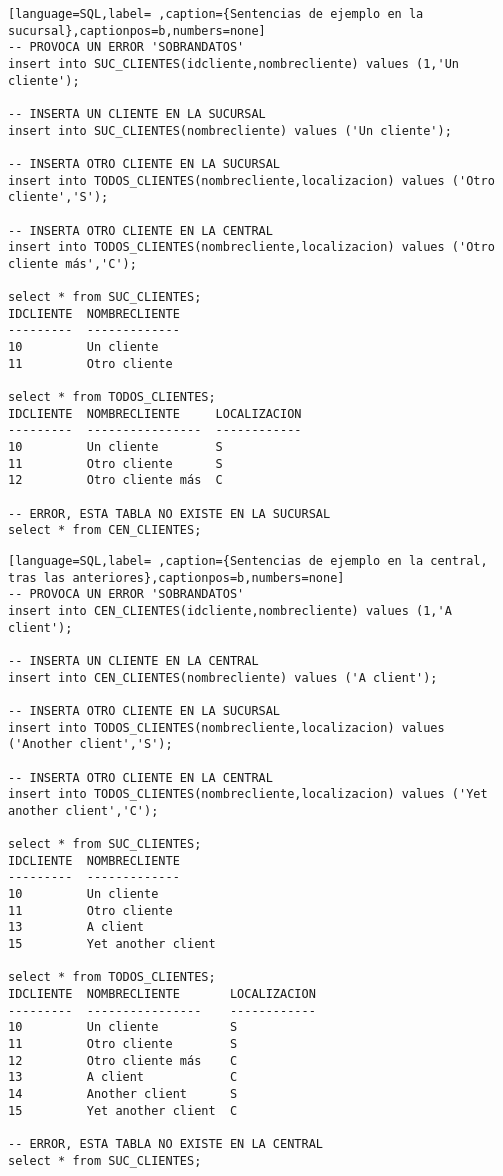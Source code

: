 \documentclass[a4paper]{article}
\begin{document}
\begin{lstlisting}[language=SQL,label= ,caption={Sentencias de ejemplo en la sucursal},captionpos=b,numbers=none]
-- PROVOCA UN ERROR 'SOBRANDATOS'
insert into SUC_CLIENTES(idcliente,nombrecliente) values (1,'Un cliente');

-- INSERTA UN CLIENTE EN LA SUCURSAL
insert into SUC_CLIENTES(nombrecliente) values ('Un cliente');

-- INSERTA OTRO CLIENTE EN LA SUCURSAL
insert into TODOS_CLIENTES(nombrecliente,localizacion) values ('Otro cliente','S');

-- INSERTA OTRO CLIENTE EN LA CENTRAL
insert into TODOS_CLIENTES(nombrecliente,localizacion) values ('Otro cliente más','C');

select * from SUC_CLIENTES;
IDCLIENTE  NOMBRECLIENTE
---------  -------------
10         Un cliente
11         Otro cliente

select * from TODOS_CLIENTES;
IDCLIENTE  NOMBRECLIENTE     LOCALIZACION
---------  ----------------  ------------
10         Un cliente        S
11         Otro cliente      S
12         Otro cliente más  C

-- ERROR, ESTA TABLA NO EXISTE EN LA SUCURSAL
select * from CEN_CLIENTES;
\end{lstlisting}

\begin{lstlisting}[language=SQL,label= ,caption={Sentencias de ejemplo en la central, tras las anteriores},captionpos=b,numbers=none]
-- PROVOCA UN ERROR 'SOBRANDATOS'
insert into CEN_CLIENTES(idcliente,nombrecliente) values (1,'A client');

-- INSERTA UN CLIENTE EN LA CENTRAL
insert into CEN_CLIENTES(nombrecliente) values ('A client');

-- INSERTA OTRO CLIENTE EN LA SUCURSAL
insert into TODOS_CLIENTES(nombrecliente,localizacion) values ('Another client','S');

-- INSERTA OTRO CLIENTE EN LA CENTRAL
insert into TODOS_CLIENTES(nombrecliente,localizacion) values ('Yet another client','C');

select * from SUC_CLIENTES;
IDCLIENTE  NOMBRECLIENTE
---------  -------------
10         Un cliente
11         Otro cliente
13         A client
15         Yet another client

select * from TODOS_CLIENTES;
IDCLIENTE  NOMBRECLIENTE       LOCALIZACION
---------  ----------------    ------------
10         Un cliente          S
11         Otro cliente        S
12         Otro cliente más    C
13         A client            C
14         Another client      S
15         Yet another client  C

-- ERROR, ESTA TABLA NO EXISTE EN LA CENTRAL
select * from SUC_CLIENTES;
\end{lstlisting}
\end{document}
